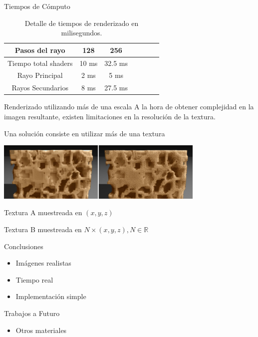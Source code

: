 \documentclass[spanish]{beamer}
\begin{document}
\begin{frame}{Tiempos de Cómputo}

\begin{table}[htb]
\centering

\begin{tabular}{|c|c|c|c|c|c|c|}
\hline
 Pasos del rayo         & 128 &  256 \\
\hline
\hline
 Tiempo total shaders   & 10 ms &  32.5 ms \\
\hline
 Rayo Principal         & 2 ms  & 5 ms  \\
\hline
 Rayos Secundarios      &  8 ms & 27.5 ms  \\
\hline
\end{tabular}
\caption{Detalle de tiempos de renderizado en milisegundos.}
\label{tab:n2}
\end{table}


\end{frame}

\begin{frame}{Renderizado utilizando más de una escala}
A la hora de obtener complejidad en la imagen resultante, existen limitaciones en la resolución de la textura.

Una solución consiste en utilizar más de una textura

\centerline{\includegraphics[width=10cm]{../figures/multiscale}}

Textura A muestreada en $(x,y,z)$

Textura B muestreada en $N\times (x,y,z), N \in \mathbb{R}$

\end{frame}



\begin{frame}{Conclusiones}
\begin{itemize}
\item Imágenes realistas
\item Tiempo real
\item Implementación simple
\end{itemize}

\begin{block}{Trabajos a Futuro}
\begin{itemize}
\item Otros materiales
\end{itemize}
\end{block}
\end{frame}
\end{document}
